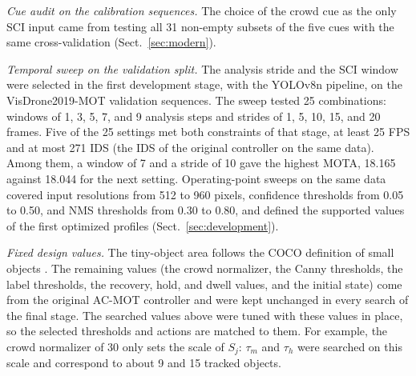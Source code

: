 \documentclass[pdflatex,sn-mathphys-num,iicol]{sn-jnl}
\begin{document}
\emph{Cue audit on the calibration sequences.} The choice of the crowd cue as
the only SCI input came from testing all 31 non-empty subsets of the five
cues with the same cross-validation (Sect.~\ref{sec:modern}).

\emph{Temporal sweep on the validation split.} The analysis stride and the
SCI window were selected in the first development stage, with the YOLOv8n
pipeline, on the VisDrone2019-MOT validation sequences. The sweep tested 25
combinations: windows of 1, 3, 5, 7, and 9 analysis steps and strides of 1, 5,
10, 15, and 20 frames. Five of the 25 settings met both constraints of that
stage, at least 25 FPS and at most 271 IDS (the IDS of the original controller
on the same data). Among them, a window of 7 and a stride of 10 gave the
highest MOTA, 18.165 against 18.044 for the next setting. Operating-point
sweeps on the same data covered input resolutions from 512 to 960 pixels,
confidence thresholds from 0.05 to 0.50, and NMS thresholds from 0.30 to 0.80,
and defined the supported values of the first optimized profiles
(Sect.~\ref{sec:development}).

\emph{Fixed design values.} The tiny-object area follows the COCO definition
of small objects \cite{lin2014coco}. The remaining values (the crowd
normalizer, the Canny thresholds, the label thresholds, the recovery, hold,
and dwell values, and the initial state) come from the original AC-MOT
controller and were kept unchanged in every search of the final stage. The
searched values above
were tuned with these values in place, so the selected thresholds and actions
are matched to them. For example, the crowd normalizer of 30 only sets the
scale of $S_j$: $\tau_m$ and $\tau_h$ were searched on this scale and
correspond to about 9 and 15 tracked objects.
\end{document}
